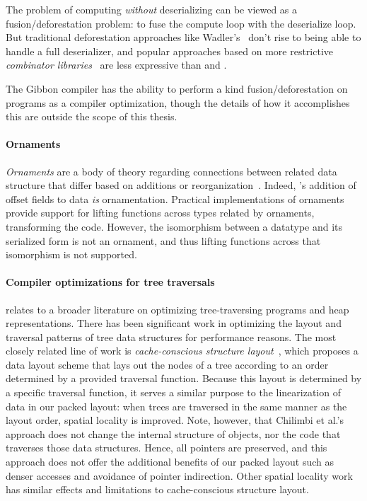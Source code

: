 The problem of computing \emph{without} deserializing can be viewed as a
fusion/deforestation problem: to fuse the compute loop with the deserialize
loop. But traditional deforestation approaches like
Wadler's~\cite{wadler-deforestation} don't rise to being able to handle a full
deserializer, and popular approaches based on more restrictive \emph{combinator
libraries}~\cite{stream-fusion} are less expressive than \lamadt{} and
\ourcalc{}.

The Gibbon compiler has the ability to perform a kind fusion/deforestation on
\lamadt{} programs as a compiler optimization, though the details of how it
accomplishes this are outside the scope of this thesis.

\paragraph{Ornaments}

\emph{Ornaments} are a body of theory regarding connections between related
data structure that differ based on additions or
reorganization~\cite{ornaments}.
%
Indeed, \ourcalc's addition of offset fields to data {\em is} ornamentation.
%
Practical implementations of ornaments~\cite{ornament-ml} provide support for
lifting functions across types related by ornaments, transforming the code.
%
However, the isomorphism between a datatype and its serialized form is not an
ornament, and thus lifting functions across that isomorphism is not supported.


\paragraph{Compiler optimizations for tree traversals}

\ourcalc{} relates to a broader literature on optimizing
tree-traversing programs and heap representations.
%
There has been significant work in optimizing the layout and
traversal patterns of tree data structures for performance reasons.
%
The most closely related line of work is \emph{cache-conscious structure
  layout}~\cite{chilimbi1999}, which proposes a data layout scheme that lays out
the nodes of a tree according to an order determined by a provided traversal
function. Because this layout is determined by a specific traversal function,
it serves a similar purpose to the linearization of data in our packed layout:
when trees are traversed in the same manner as the layout order, spatial
locality is improved. Note, however, that Chilimbi et al.'s approach does not
change the internal structure of objects, nor the code that traverses those
data structures. Hence, all pointers are preserved, and this approach does not
offer the additional benefits of our packed layout such as denser accesses and
avoidance of pointer indirection. Other spatial locality
work~\cite{Truong1998,Lattner2005,Chilimbi1999a} has similar effects and
limitations to cache-conscious structure layout.

